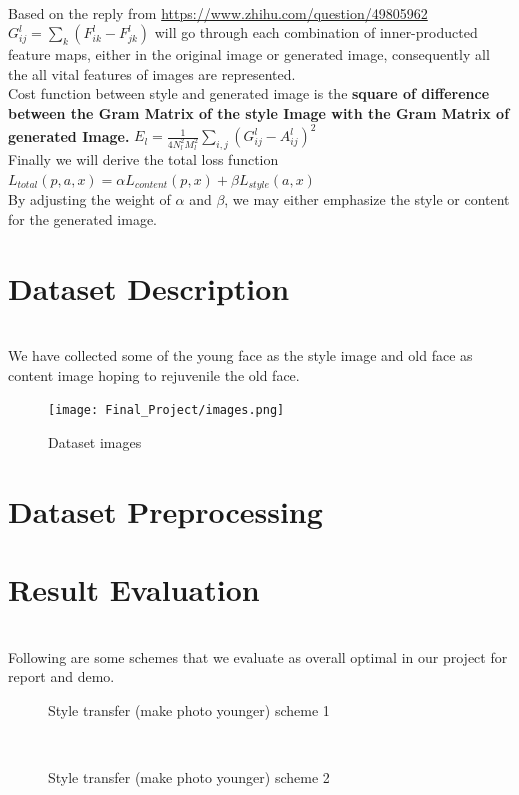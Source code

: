\documentclass[11pt, a4paper]{article} %
\begin{document}
\\ Based on the reply from \url{https://www.zhihu.com/question/49805962}
\\ $G^{l}_{ij} = \sum_{k}(F^{l}_{ik} - F^l_{jk})$ will go through each combination of inner-producted feature maps, either in the original image or generated image, consequently all the all vital features of images are represented.
\\ Cost function between style and generated image is the \textbf{square of difference between the Gram Matrix of the style Image with the Gram Matrix of generated Image.} $E_{l} = \frac{1}{4N^{2}_{l}M^2_{l}} \sum_{i, j}(G^{l}_{ij} - A^l_{ij})^2$
\\ Finally we will derive the total loss function $L_{total}(p, a, x) = \alpha L_{content}(p, x) + \beta L_{style}(a, x)$
\\ By adjusting the weight of $\alpha$ and $\beta$, we may either emphasize the style or content for the generated image.

\section{Dataset Description}
\\ We have collected some of the young face as the style image and old face as content image hoping to rejuvenile the old face.
\begin{figure}[H]
    \centering
    \texttt{[image: Final\_Project/images.png]}
    \caption{Dataset images}
    \label{fig:my_label}
\end{figure}
\section{Dataset Preprocessing}
\section{Result Evaluation}
\\ Following are some schemes that we evaluate as overall optimal in our project for report and demo.
\begin{figure}[H]
    \centering
    \hfill
    \hfill
    \hfill
    \caption{Style transfer (make photo younger) scheme 1}
\end{figure}
\\
\begin{figure}[H]
    \centering
    \hfill
    \hfill
    \hfill
    \caption{Style transfer (make photo younger) scheme 2}
\end{figure}
\end{document}
